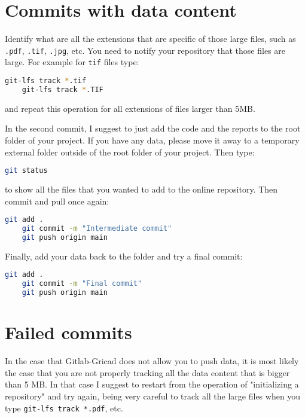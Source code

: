 \documentclass{article}
\begin{document}
\section*{Commits with data content}

Identify what are all the extensions that are specific of those large files, such as \texttt{.pdf}, \texttt{.tif}, \texttt{.jpg}, etc.
You need to notify your repository that those files are large. For example for \texttt{tif} files type:
\begin{lstlisting}[language=bash]
    git-lfs track *.tif
    git-lfs track *.TIF
\end{lstlisting}
and repeat this operation for all extensions of files larger than 5MB.

In the second commit, I suggest to just add the code and the reports to the root folder of your project. If you have any data, please move it away to a temporary external folder outside of the root folder of your project.
Then type:
\begin{lstlisting}[language=bash]
    git status
\end{lstlisting}
to show all the files that you wanted to add to the online repository.
Then commit and pull once again:
\begin{lstlisting}[language=bash]
    git add .
    git commit -m "Intermediate commit"
    git push origin main
\end{lstlisting}

Finally, add your data back to the folder and try a final commit:

\begin{lstlisting}[language=bash]
    git add .
    git commit -m "Final commit"
    git push origin main
\end{lstlisting}

\section*{Failed commits}

In the case that Gitlab-Gricad does not allow you to push data, it is most likely the case that you are not properly tracking all the data content that is bigger than 5 MB. In that case I suggest to restart from the operation of "initializing a repository" and try again, being very careful to track all the large files when you type \texttt{git-lfs track *.pdf}, etc.
\end{document}
